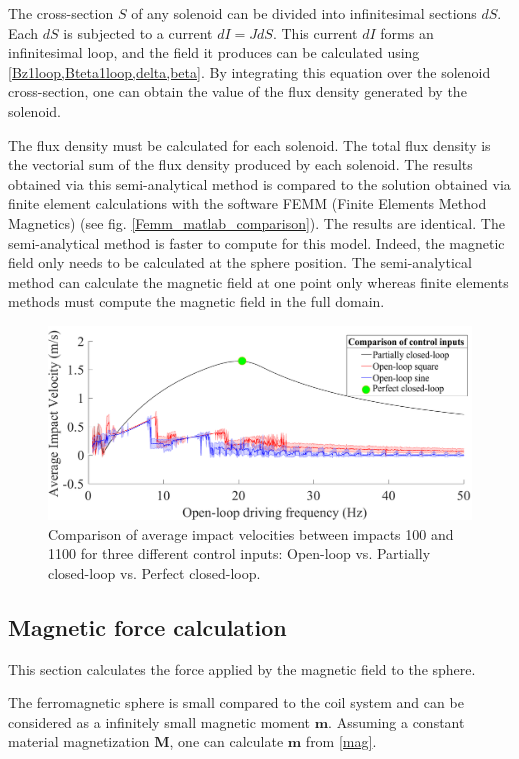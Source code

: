 \documentclass[letterpaper, 10 pt, journal, twoside]{ieeetran}
\begin{document}
The cross-section $S$ of any solenoid can be divided into infinitesimal sections $dS$. Each $dS$ is subjected to a current $dI=JdS$. This current $dI$ forms an infinitesimal loop, and the field it produces can be calculated using \cref{Bz1loop,Bteta1loop,delta,beta}. By integrating this equation over the solenoid cross-section, one can obtain the value of the flux density generated by the solenoid.\par
The flux density must be calculated for each solenoid. The total flux density is the vectorial sum of the flux density produced by each solenoid. The results obtained via this semi-analytical method is compared to the solution obtained via finite element calculations with the software FEMM (Finite Elements Method Magnetics)\cite{femm} (see fig. \ref{Femm_matlab_comparison}). The results are identical. The semi-analytical method is faster to compute for this model. Indeed, the magnetic field only needs to be calculated at the sphere position. The semi-analytical method can calculate the magnetic field at one point only whereas finite elements methods must compute the magnetic field in the full domain.

\begin{figure}
	\includegraphics[width=\linewidth]{ComparisonOfControlInputs.pdf}
	\caption[Comparison of impact velocities from three control inputs]{Comparison of average impact velocities between impacts 100 and 1100 for three different control inputs: Open-loop vs. Partially closed-loop vs. Perfect closed-loop.}
	\label{CLvsOL}
\end{figure}
\subsection{Magnetic force calculation}
\label{magforce}

This section calculates the force applied by the magnetic field to the sphere.\par
The ferromagnetic sphere is small compared to the coil system and can be considered as a infinitely small magnetic moment $\mathbf{m}$. Assuming a constant material magnetization $\mathbf{M}$, one can calculate $\mathbf{m}$ from \cref{mag}.
\end{document}
